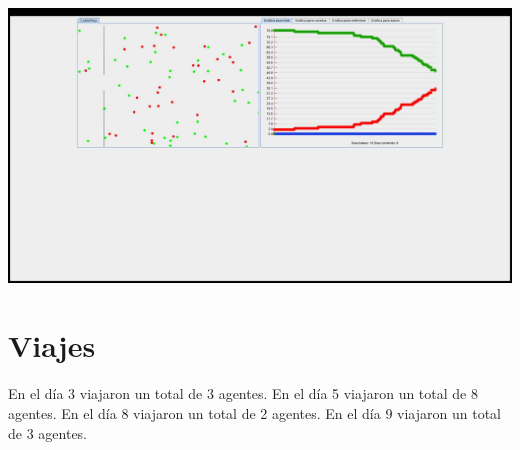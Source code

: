 \documentclass{report}
\begin{document}
\includegraphics[scale=0.20]{8}
\newpage
\section{Viajes}
En el d\'ia 3 viajaron un total de 3 agentes.\n
En el d\'ia 5 viajaron un total de 8 agentes.\n
En el d\'ia 8 viajaron un total de 2 agentes.\n
En el d\'ia 9 viajaron un total de 3 agentes.\newline
\end{document}
